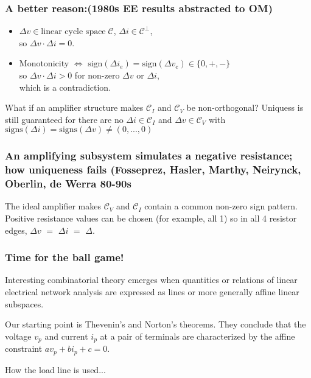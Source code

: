 \documentclass{beamer}
\begin{document}
\begin{frame}
\frametitle{A better reason:(1980s EE results abstracted to OM)}

\begin{itemize}
\item
$\Delta v \in \text{linear cycle space}\; \mathcal{C}$,
$\Delta i \in \mathcal{C}^{\perp}$, \\
so $\Delta v \cdot \Delta i = 0$.  
\item
Monotonicity $\Leftrightarrow$ 
$\text{sign}(\Delta i_e) = \text{sign}(\Delta v_e) \in \{0, +, -\}$\\
so
$\Delta v \cdot \Delta i > 0$ for non-zero $\Delta v$ or $\Delta i$,\\
which is a contradiction.
\end{itemize}


What if an amplifier structure makes $\mathcal{C}_I$ and $\mathcal{C}_V$ be
non-orthogonal?  Uniquess is still guaranteed for there are no
$\Delta i\in \mathcal{C}_I$ and $\Delta v \in \mathcal{C}_V$ with
$\text{signs}(\Delta i) = \text{signs}(\Delta v) \neq (0, ..., 0)$



\end{frame}

\begin{frame}
\frametitle{An amplifying subsystem simulates a negative resistance; 
how uniqueness fails 
(Fosseprez, Hasler, Marthy, Neirynck, Oberlin, de Werra 80-90s}





\begin{minipage}[b]{2.3in}
The ideal amplifier makes $\mathcal{C}_V$ and
$\mathcal{C}_I$ contain a common non-zero sign pattern.
Positive resistance values can be chosen (for example, all 1) so 
in all 4 resistor edges, $\Delta v$ $=$ $\Delta i$ $=$ $\Delta$.
\end{minipage}



\end{frame}


\begin{frame}
\frametitle{Time for the ball game!}
\end{frame}


\begin{frame}
Interesting combinatorial theory emerges when quantities or relations
of linear electrical network analysis are expressed as lines or more
generally affine linear subspaces.

Our starting point is Thevenin's and Norton's theorems.  They conclude that
the voltage $v_p$ and current $i_p$ at a pair of terminals are characterized
by the affine constraint $av_p + bi_p + c = 0$.  

How the load line is used...

\end{frame}
\end{document}
